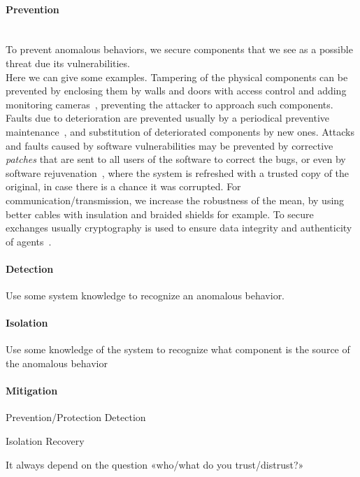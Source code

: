 \documentclass[../main.tex]{subfiles}
\begin{document}
\paragraph{Prevention}
~\\To prevent anomalous behaviors, we secure components that we see as a possible threat due its vulnerabilities.
\\Here we can give some examples.
Tampering of the physical components can be prevented by enclosing them by walls and doors with access control and adding monitoring cameras~\cite{CardenasEtAl2008,DingEtAl2018}, preventing the attacker to approach such components.
Faults due to deterioration are prevented usually by a periodical preventive maintenance~\cite{ChenEtAl2021}, and substitution of deteriorated components by new ones.
Attacks and faults caused by software vulnerabilities may be prevented by corrective \emph{patches} that are sent to all users of the software to correct the bugs, or even by software rejuvenation~\cite{GriffioenEtAl2020}, where the system is refreshed with a trusted copy of the original, in case there is a chance it was corrupted.
For communication/transmission, we increase the robustness of the mean, by using better cables with insulation and braided shields for example.
To secure exchanges usually cryptography is used to ensure data integrity and authenticity of agents~\cite{DingEtAl2018}.

\paragraph{Detection}
Use some system knowledge to recognize an anomalous behavior.

\paragraph{Isolation}
Use some  knowledge of the system to recognize what component is the source of the anomalous behavior

\paragraph{Mitigation}





Prevention/Protection
Detection

Isolation
Recovery

It always depend on the question «who/what do you trust/distrust?»
\end{document}

